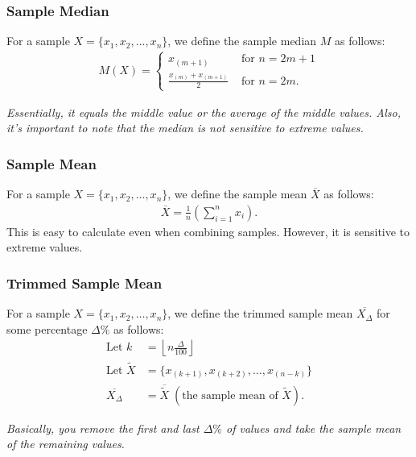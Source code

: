 \documentclass[a4paper, 12pt, twoside]{article}
\def\lf{\left\lfloor}
\def\rf{\right\rfloor}
\begin{document}
\subsubsection{Sample Median}

For a sample $X = \{x_1, x_2, \ldots, x_n\}$, we define the sample
median $M$ as follows:
\begin{align*}
    M(X) = \begin{cases}
        x_{(m + 1)}                     & \text{ for } n = 2m + 1 \\
        \frac{x_{(m)} + x_{(m + 1)}}{2} & \text{ for } n = 2m.
    \end{cases}
\end{align*}

\textit{Essentially, it equals the middle value or the average of the
    middle values. Also, it's important to note that the median is not
    sensitive to extreme values.}

\subsubsection{Sample Mean}

For a sample $X = \{x_1, x_2, \ldots, x_n\}$, we define the sample
mean $\overline{X}$ as follows:
\begin{align*}
    \overline{X} = \frac{1}{n}\left(\sum_{i = 1}^{n} x_i \right).
\end{align*}
This is easy to calculate even when combining samples. However, it is
sensitive to extreme values.

\subsubsection{Trimmed Sample Mean}

For a sample $X = \{x_1, x_2, \ldots, x_n\}$, we define the trimmed
sample mean $\overline{X_\Delta}$ for some percentage $\Delta\%$ as follows:
\begin{align*}
    \text{Let } k         & = \lf n \frac{\Delta}{100} \rf \\
    \text{Let } \tilde{X} & = \{x_{(k + 1)}, x_{(k + 2)},
    \ldots, x_{(n - k)}\}                                  \\
    \overline{X_\Delta}   & = \overline{\tilde{X}} \;
    (\text{the sample mean of } \tilde{X}).
\end{align*}

\textit{Basically, you remove the first and last $\Delta\%$
    of values and take the sample mean of the remaining values.}
\end{document}
